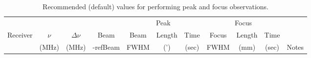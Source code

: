 \begin{table}[!h]
\begin{center}
\caption[Peak and Focus recommendations]{Recommended (default) values for 
performing peak and focus observations.
\label{table:pointing}}
{\footnotesize
\begin{tabular}{lrrccrrcrrr}
\toprule
\multicolumn{4}{c}{} & \multicolumn{3}{c}{Peak}& \multicolumn{3}{c}{Focus} & \\
\cmidrule(lr){5-7} \cmidrule(lr){8-10}
Receiver & \multicolumn{1}{c}{$\nu$} & \multicolumn{1}{c}{$\Delta\nu$} & Beam  &
 Beam & \multicolumn{1}{c}{Length} & \multicolumn{1}{c}{Time} & Focus &
\multicolumn{1}{c}{Length}& \multicolumn{1}{c}{Time} \\

& \multicolumn{1}{c}{(MHz)} & \multicolumn{1}{c}{(MHz)} &-refBeam & FWHM &
\multicolumn{1}{c}{(')} & \multicolumn{1}{c}{(sec)} & FWHM &
\multicolumn{1}{c}{(mm)}  & \multicolumn{1}{c}{(sec)} & Notes \\


\end{tabular}}
\end{center}
\end{table}

